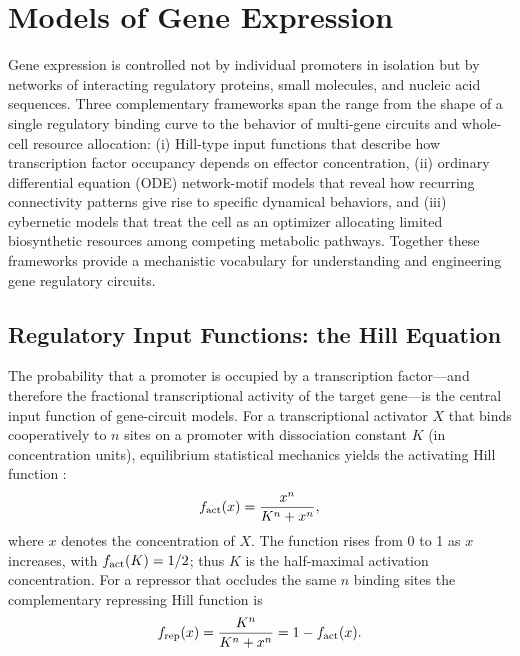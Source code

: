 \section{Models of Gene Expression}\label{sec:gene}

Gene expression is controlled not by individual promoters in isolation but by
networks of interacting regulatory proteins, small molecules, and nucleic acid
sequences.  Three complementary frameworks span the range from the shape of a
single regulatory binding curve to the behavior of multi-gene circuits and
whole-cell resource allocation: (i) Hill-type input functions that describe how
transcription factor occupancy depends on effector concentration, (ii) ordinary
differential equation (ODE) network-motif models that reveal how recurring
connectivity patterns give rise to specific dynamical behaviors, and (iii)
cybernetic models that treat the cell as an optimizer allocating limited
biosynthetic resources among competing metabolic pathways.  Together these
frameworks provide a mechanistic vocabulary for understanding and engineering
gene regulatory circuits.

\subsection{Regulatory Input Functions: the Hill Equation}
\label{sec:hill}

The probability that a promoter is occupied by a transcription factor---and
therefore the fractional transcriptional activity of the target gene---is the
central input function of gene-circuit models.  For a transcriptional
activator $X$ that binds cooperatively to $n$ sites on a promoter with
dissociation constant $K$ (in concentration units), equilibrium statistical
mechanics yields the activating Hill function
\cite{Alon2006}:
\begin{equation}\label{eq:hill_act}
  f_{\rm act}(x) = \frac{x^n}{K^n + x^n},
\end{equation}
where $x$ denotes the concentration of $X$.  The function rises from 0 to 1
as $x$ increases, with $f_{\rm act}(K) = 1/2$; thus $K$ is the half-maximal
activation concentration.  For a repressor that occludes the same $n$ binding
sites the complementary repressing Hill function is
\begin{equation}\label{eq:hill_rep}
  f_{\rm rep}(x) = \frac{K^n}{K^n + x^n} = 1 - f_{\rm act}(x).
\end{equation}

